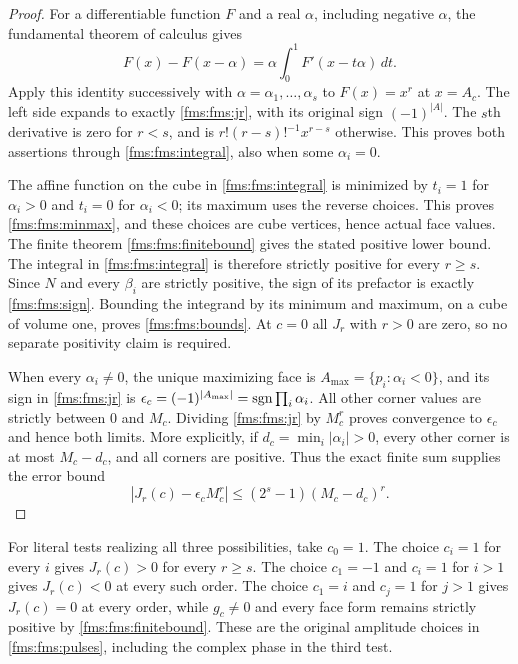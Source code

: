 \begin{proof}
For a differentiable function $F$ and a real $\alpha$, including
negative $\alpha$, the fundamental theorem of calculus gives
\[
 F(x)-F(x-\alpha)=
       \alpha\int_0^1F'(x-t\alpha)\,dt.
\]
Apply this identity successively with
$\alpha=\alpha_1,\ldots,\alpha_s$ to $F(x)=x^r$ at $x=A_c$.
The left side expands to exactly \eqref{fms:fms:jr}, with its original
sign $(-1)^{|A|}$. The $s$th derivative is zero for $r<s$, and
is $r!(r-s)!^{-1}x^{r-s}$ otherwise. This proves both assertions
through \eqref{fms:fms:integral}, also when some $\alpha_i=0$.

The affine function on the cube in \eqref{fms:fms:integral} is
minimized by $t_i=1$ for $\alpha_i>0$ and $t_i=0$ for
$\alpha_i<0$; its maximum uses the reverse choices.
This proves \eqref{fms:fms:minmax}, and these choices are cube
vertices, hence actual face values. The finite theorem
\eqref{fms:fms:finitebound} gives the stated positive lower bound.
The integral in \eqref{fms:fms:integral} is therefore strictly positive
for every $r\ge s$. Since $N$ and every $\beta_i$ are strictly
positive, the sign of its prefactor is exactly
\eqref{fms:fms:sign}. Bounding the integrand by its minimum and
maximum, on a cube of volume one, proves \eqref{fms:fms:bounds}.
At $c=0$ all $J_r$ with $r>0$ are zero, so no separate positivity
claim is required.

When every $\alpha_i\ne0$, the unique maximizing face is
$A_{\max}=\{p_i:\alpha_i<0\}$, and its sign in
\eqref{fms:fms:jr} is
$\epsilon_c=(-1)^{|A_{\max}|}=\operatorname{sgn}\prod_i\alpha_i$.
All other corner values are strictly between $0$ and $M_c$.
Dividing \eqref{fms:fms:jr} by $M_c^r$ proves convergence to
$\epsilon_c$ and hence both limits. More explicitly, if
$d_c=\min_i|\alpha_i|>0$, every other corner is at most
$M_c-d_c$, and all corners are positive. Thus the exact finite
sum supplies the error bound
\begin{equation}\tag{FMS43}\label{fms:fms:rateerror}
 |J_r(c)-\epsilon_c M_c^r|
       \le(2^s-1)(M_c-d_c)^r.
\end{equation}
\end{proof}

For literal tests realizing all three possibilities, take $c_0=1$.
The choice $c_i=1$ for every $i$ gives $J_r(c)>0$ for every
$r\ge s$. The choice $c_1=-1$ and $c_i=1$ for $i>1$ gives
$J_r(c)<0$ at every such order. The choice $c_1=i$ and
$c_j=1$ for $j>1$ gives $J_r(c)=0$ at every order, while
$g_c\ne0$ and every face form remains strictly positive by
\eqref{fms:fms:finitebound}. These are the original amplitude choices
in \eqref{fms:fms:pulses}, including the complex phase in the third test.

